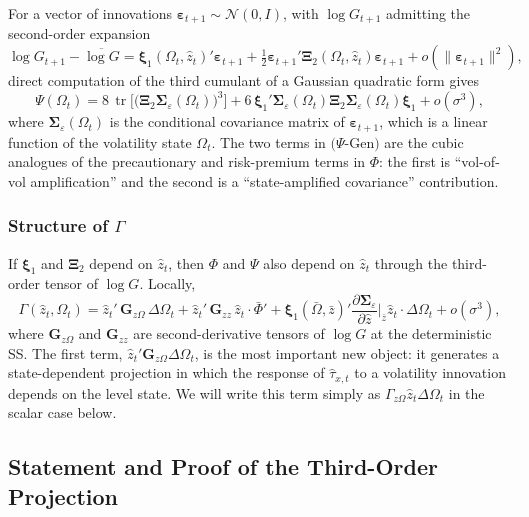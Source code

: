 \documentclass[11pt]{article}
\newcommand{\tr}{\operatorname{tr}}
\newcommand{\mc}[1]{\mathcal{#1}}
\newcommand{\bs}[1]{\boldsymbol{#1}}
\theoremstyle{plain}
\theoremstyle{definition}
\begin{document}
For a vector of innovations $\bs{\varepsilon}_{t+1}\sim\mc{N}(0,I)$, with
$\log G_{t+1}$ admitting the second-order expansion
\[
\log G_{t+1}-\overline{\log G}
= \bs{\xi}_1(\Omega_t,\hat z_t)'\bs{\varepsilon}_{t+1}
+ \tfrac{1}{2}\bs{\varepsilon}_{t+1}'\bs{\Xi}_2(\Omega_t,\hat z_t)\bs{\varepsilon}_{t+1}
+ o(\|\bs{\varepsilon}_{t+1}\|^2),
\]
direct computation of the third cumulant of a Gaussian quadratic form gives
\begin{equation}
\Psi(\Omega_t)
= 8\,\tr\!\big[\big(\bs{\Xi}_2\bs{\Sigma}_\varepsilon(\Omega_t)\big)^3\big]
+ 6\,\bs{\xi}_1'\bs{\Sigma}_\varepsilon(\Omega_t)\bs{\Xi}_2\bs{\Sigma}_\varepsilon(\Omega_t)\bs{\xi}_1
+ o(\sigma^3),
\tag{$\Psi$-Gen}
\end{equation}
where $\bs{\Sigma}_\varepsilon(\Omega_t)$ is the conditional covariance matrix
of $\bs{\varepsilon}_{t+1}$, which is a linear function of the volatility state
$\Omega_t$. The two terms in $(\Psi$-Gen$)$ are the cubic
analogues of the precautionary and risk-premium terms in $\Phi$: the first is
``vol-of-vol amplification'' and the second is a ``state-amplified covariance''
contribution.

\subsubsection*{Structure of $\Gamma$}

If $\bs{\xi}_1$ and $\bs{\Xi}_2$ depend on $\hat z_t$, then $\Phi$ and $\Psi$
also depend on $\hat z_t$ through the third-order tensor of $\log G$. Locally,
\begin{equation}
\Gamma(\hat z_t,\Omega_t)
=
\hat z_t'\,\bs{G}_{z\Omega}\,\Delta\Omega_t
+
\hat z_t'\,\bs{G}_{zz}\,\hat z_t\cdot\bar\Phi'
+
\bs{\xi}_1(\bar\Omega,\bar z)'\frac{\partial\bs{\Sigma}_\varepsilon}{\partial\hat z}
\bigg|_{\bar z}\hat z_t\cdot\Delta\Omega_t
+ o(\sigma^3),
\tag{$\Gamma$-Gen}
\end{equation}
where $\bs{G}_{z\Omega}$ and $\bs{G}_{zz}$ are second-derivative tensors of
$\log G$ at the deterministic SS. The first term, $\hat z_t' \bs{G}_{z\Omega}
\Delta\Omega_t$, is the most important new object: it generates a state-dependent
projection in which the response of $\hat\tau_{x,t}$ to a volatility innovation
depends on the level state. We will write this term simply as $\Gamma_{z\Omega}
\hat z_t\Delta\Omega_t$ in the scalar case below.

\subsection{Statement and Proof of the Third-Order Projection}
\end{document}
